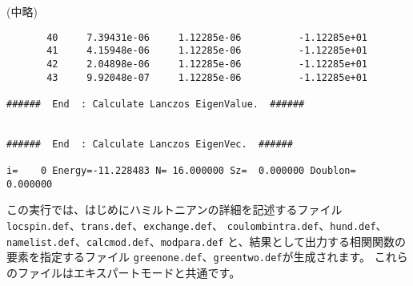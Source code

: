 \normalsize
(中略)
\small
\begin{verbatim}
       40     7.39431e-06     1.12285e-06          -1.12285e+01
       41     4.15948e-06     1.12285e-06          -1.12285e+01
       42     2.04898e-06     1.12285e-06          -1.12285e+01
       43     9.92048e-07     1.12285e-06          -1.12285e+01

######  End  : Calculate Lanczos EigenValue.  ######


######  End  : Calculate Lanczos EigenVec.  ######

i=    0 Energy=-11.228483 N= 16.000000 Sz=  0.000000 Doublon=  0.000000
\end{verbatim}
\normalsize

この実行では、はじめにハミルトニアンの詳細を記述するファイル
\verb|locspin.def|、\verb|trans.def|、\verb|exchange.def|、
\verb|coulombintra.def|、\verb|hund.def|、
\verb|namelist.def|、\verb|calcmod.def|、\verb|modpara.def|
と、結果として出力する相関関数の要素を指定するファイル
\verb|greenone.def|、\verb|greentwo.def|が生成されます。
これらのファイルはエキスパートモードと共通です。

%
%

